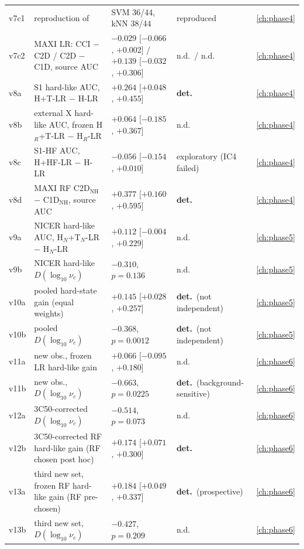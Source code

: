{\begin{longtable}{@{}p{1.1cm}>{\raggedright\arraybackslash}p{5.5cm}>{\raggedright\arraybackslash}p{4.6cm}>{\raggedright\arraybackslash}p{2.5cm}l@{}}
v7c1 & reproduction of \citet{deBeurs2022} & SVM 36/44, kNN 38/44 & reproduced & \ref{ch:phase4} \\
v7c2 & MAXI LR: CCI $-$ C2D / C2D $-$ C1D, source AUC & $-0.029$ [$-0.066$, $+0.002$] / $+0.139$ [$-0.032$, $+0.306$] & n.d.\ / n.d. & \ref{ch:phase4} \\
v8a & S1 hard-like AUC, H+T-LR $-$ H-LR & $+0.264$ [$+0.048$, $+0.455$] & \textbf{det.} & \ref{ch:phase4} \\
v8b & external X hard-like AUC, frozen H$_R$+T-LR $-$ H$_R$-LR & $+0.064$ [$-0.185$, $+0.367$] & n.d. & \ref{ch:phase4} \\
v8c & S1-HF AUC, H+HF-LR $-$ H-LR & $-0.056$ [$-0.154$, $+0.010$] & exploratory (IC4 failed) & \ref{ch:phase4} \\
v8d & MAXI RF C2D$_\mathrm{NH}$ $-$ C1D$_\mathrm{NH}$, source AUC & $+0.377$ [$+0.160$, $+0.595$] & \textbf{det.} & \ref{ch:phase4} \\
v9a & NICER hard-like AUC, H$_N$+T$_N$-LR $-$ H$_N$-LR & $+0.112$ [$-0.004$, $+0.229$] & n.d. & \ref{ch:phase5} \\
v9b & NICER hard-like $D(\log_{10}\nu_c)$ & $-0.310$, $p=0.136$ & n.d. & \ref{ch:phase5} \\
v10a & pooled hard-state gain (equal weights) & $+0.145$ [$+0.028$, $+0.257$] & \textbf{det.}\ (not independent) & \ref{ch:phase5} \\
v10b & pooled $D(\log_{10}\nu_c)$ & $-0.368$, $p=0.0012$ & \textbf{det.}\ (not independent) & \ref{ch:phase5} \\
v11a & new obs., frozen LR hard-like gain & $+0.066$ [$-0.095$, $+0.180$] & n.d. & \ref{ch:phase6} \\
v11b & new obs., $D(\log_{10}\nu_c)$ & $-0.663$, $p=0.0225$ & \textbf{det.}\ (background-sensitive) & \ref{ch:phase6} \\
v12a & 3C50-corrected $D(\log_{10}\nu_c)$ & $-0.514$, $p=0.073$ & n.d. & \ref{ch:phase6} \\
v12b & 3C50-corrected RF hard-like gain (RF chosen post hoc) & $+0.174$ [$+0.071$, $+0.300$] & \textbf{det.} & \ref{ch:phase6} \\
v13a & third new set, frozen RF hard-like gain (RF pre-chosen) & $+0.184$ [$+0.049$, $+0.337$] & \textbf{det.}\ (prospective) & \ref{ch:phase6} \\
v13b & third new set, $D(\log_{10}\nu_c)$ & $-0.427$, $p=0.209$ & n.d. & \ref{ch:phase6} \\
\end{longtable}}

